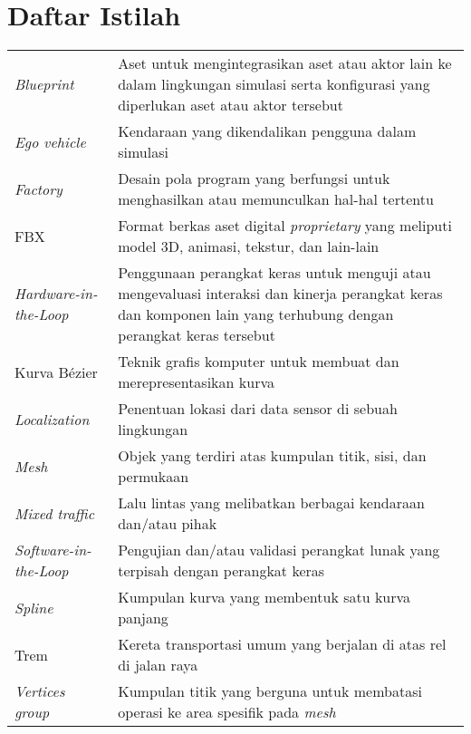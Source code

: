 \chapter*{Daftar Istilah}

\begingroup
\def\arraystretch{1.25}
\begin{onehalfspace}
\begin{longtable}{p{} p{}}

	\textit{Blueprint} & Aset untuk mengintegrasikan aset atau aktor lain ke dalam lingkungan simulasi serta konfigurasi yang diperlukan aset atau aktor tersebut \\
	\textit{Ego vehicle} & Kendaraan yang dikendalikan pengguna dalam simulasi \\
	\textit{Factory} & Desain pola program yang berfungsi untuk menghasilkan atau memunculkan hal-hal tertentu \\
	FBX & Format berkas aset digital \textit{proprietary} yang meliputi model 3D, animasi, tekstur, dan lain-lain \\
	\textit{Hardware-in-the-Loop} & Penggunaan perangkat keras untuk menguji atau mengevaluasi interaksi dan kinerja perangkat keras dan komponen lain yang terhubung dengan perangkat keras tersebut \\
	Kurva Bézier & Teknik grafis komputer untuk membuat dan merepresentasikan kurva \\
	\textit{Localization} & Penentuan lokasi dari data sensor di sebuah lingkungan \\
	\textit{Mesh} & Objek yang terdiri atas kumpulan titik, sisi, dan permukaan \\
	\textit{Mixed traffic} & Lalu lintas yang melibatkan berbagai kendaraan dan/atau pihak \\
	\textit{Software-in-the-Loop} & Pengujian dan/atau validasi perangkat lunak yang terpisah dengan perangkat keras \\
	\textit{Spline} & Kumpulan kurva yang membentuk satu kurva panjang \\
	Trem & Kereta transportasi umum yang berjalan di atas rel di jalan raya \\
	\textit{Vertices group} & Kumpulan titik yang berguna untuk membatasi operasi ke area spesifik pada \textit{mesh} \\

\end{longtable}
\end{onehalfspace}
\endgroup
\clearpage
